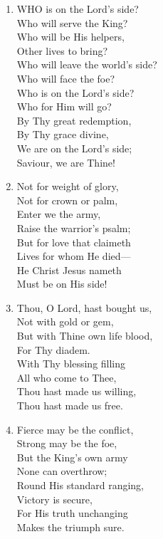 \documentclass[11pt,a4paper]{article}
\begin{document}
\begin{enumerate}
    \item WHO is on the Lord's side? \\
        Who will serve the King? \\
        Who will be His helpers, \\
        Other lives to bring? \\
        Who will leave the world's side? \\
        Who will face the foe? \\
        Who is on the Lord's side? \\
        Who for Him will go? \\
        By Thy great redemption, \\
        By Thy grace divine, \\
        We are on the Lord's side; \\
        Saviour, we are Thine!

    \item Not for weight of glory, \\
        Not for crown or palm, \\
        Enter we the army, \\
        Raise the warrior's psalm; \\
        But for love that claimeth \\
        Lives for whom He died--- \\
        He Christ Jesus nameth \\
        Must be on His side!

    \item Thou, O Lord, hast bought us, \\
        Not with gold or gem, \\
        But with Thine own life blood, \\
        For Thy diadem. \\
        With Thy blessing filling \\
        All who come to Thee, \\
        Thou hast made us willing, \\
        Thou hast made us free.

    \item Fierce may be the conflict, \\
        Strong may be the foe, \\
        But the King's own army \\
        None can overthrow; \\
        Round His standard ranging, \\
        Victory is secure, \\
        For His truth unchanging \\
        Makes the triumph sure.

\end{enumerate}
\end{document}
